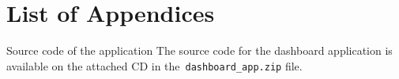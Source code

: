 \appendix
{}
\chapter*{List of Appendices}
\renewcommand{\thesection}{Appendix \Alph{section}}

\begin{section}{Source code of the application}
	\label{appendix:source-code}
	The source code for the dashboard application is available on the attached CD in the~\texttt{dashboard\_app.zip} file.
\end{section}
\newpage